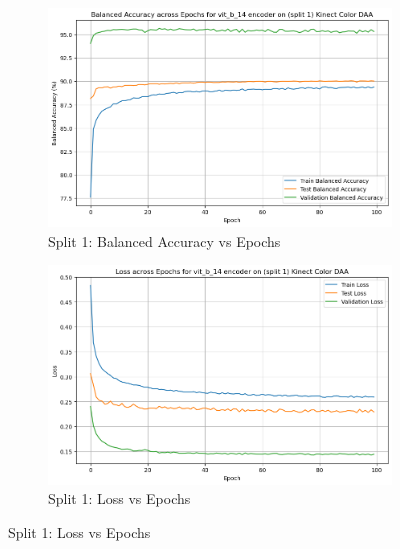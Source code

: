 \begin{figure}[htbp]
    \begin{subfigure}[b]{0.45\textwidth}
        \includegraphics[width=\textwidth]{Images_Thesis/Tensboard_runs_images_all/Experiment_03_Sel_Sup_D_B_no_Aug/Split_1/output_bal_acc_split_1_d_b_ssl.png}
        \caption{Split 1: Balanced Accuracy vs Epochs}
        \label{fig:Exp_4_03}
    \end{subfigure}
    \hfill
    \begin{subfigure}[b]{0.45\textwidth}
        \includegraphics[width=\textwidth]{Images_Thesis/Tensboard_runs_images_all/Experiment_03_Sel_Sup_D_B_no_Aug/Split_1/output_loss_split_1_d_b_ssl.png}
        \caption{Split 1:  Loss vs Epochs}
        \label{fig:Exp_4_04}
    \end{subfigure}


\end{figure}
